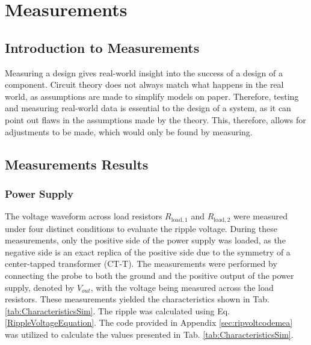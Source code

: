 \chapter{Measurements}
\label{chapter:measurements}
\section{Introduction to Measurements}
Measuring a design gives real-world insight into the success of a design of a component. Circuit theory does not always match what happens in the real world, as assumptions are made to simplify models on paper. Therefore, testing and measuring real-world data is essential to the design of a system, as it can point out flaws in the assumptions made by the theory. This, therefore, allows for adjustments to be made, which would only be found by measuring.

\section{Measurements Results}
\subsection{Power Supply}
The voltage waveform across load resistors $R_{\text{load},1}$ and $R_{\text{load},2}$ were measured under four distinct conditions to evaluate the ripple voltage. During these measurements, only the positive side of the power supply was loaded, as the negative side is an exact replica of the positive side due to the symmetry of a center-tapped transformer (CT-T). The measurements were performed by connecting the probe to both the ground and the positive output of the power supply, denoted by $V_{out}$, with the voltage being measured across the load resistors. These measurements yielded the characteristics shown in Tab. \ref{tab:CharacteristicsSim}. The ripple was calculated using Eq. \ref{RippleVoltageEquation}. The code provided in Appendix \ref{sec:ripvoltcodemea} was utilized to calculate the values presented in Tab. \ref{tab:CharacteristicsSim}.

